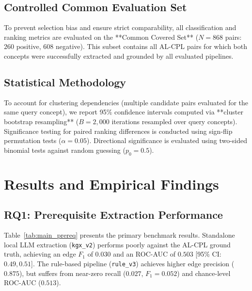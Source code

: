 \documentclass[11pt,a4paper]{article}
\begin{document}
\subsection{Controlled Common Evaluation Set}
To prevent selection bias and ensure strict comparability, all classification and ranking metrics are evaluated on the **Common Covered Set** ($N=868$ pairs: $260$ positive, $608$ negative). This subset contains all AL-CPL pairs for which both concepts were successfully extracted and grounded by all evaluated pipelines.

\subsection{Statistical Methodology}
To account for clustering dependencies (multiple candidate pairs evaluated for the same query concept), we report 95\% confidence intervals computed via **cluster bootstrap resampling** ($B=2,000$ iterations resampled over query concepts). Significance testing for paired ranking differences is conducted using sign-flip permutation tests ($\alpha = 0.05$). Directional significance is evaluated using two-sided binomial tests against random guessing ($p_0 = 0.5$).

\section{Results and Empirical Findings}

\subsection{RQ1: Prerequisite Extraction Performance}

Table~\ref{tab:main_prereq} presents the primary benchmark results. Standalone local LLM extraction (\texttt{kgx\_v2}) performs poorly against the AL-CPL ground truth, achieving an edge $F_1$ of $0.030$ and an ROC-AUC of $0.503$ [95\% CI: $0.49, 0.51$]. The rule-based pipeline (\texttt{rule\_v3}) achieves higher edge precision ($0.875$), but suffers from near-zero recall ($0.027$, $F_1 = 0.052$) and chance-level ROC-AUC ($0.513$).
\end{document}

